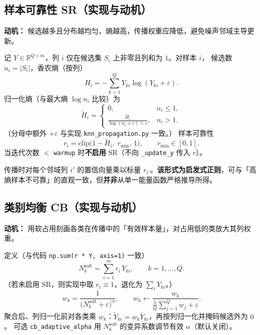 \documentclass[11pt,a4paper]{article}
\begin{document}
\subsection{样本可靠性 SR（实现与动机）}
\textbf{动机：} 候选越多且分布越均匀，熵越高，传播权重应降低，避免噪声邻域主导更新。

记 $Y\in\mathbb{R}^{Q\times m}$，列 $i$ 仅在候选集 $S_i$ 上非零且列和为 $1$。对样本 $i$，
候选数 $n_i=|S_i|$，香农熵（按列）
\begin{equation}
H_i = -\sum_{k=1}^{Q} Y_{ki}\log(Y_{ki}+\varepsilon).
\end{equation}
归一化熵（与最大熵 $\log n_i$ 比较）为
\begin{equation}
\tilde{H}_i =
\begin{cases}
0, & n_i \le 1,\\
\displaystyle\frac{H_i}{\log(n_i+\varepsilon)+\varepsilon}, & n_i>1 .
\end{cases}
\end{equation}
（分母中额外 $+\varepsilon$ 与实现 \texttt{knn\_propagation.py} 一致。）
样本可靠性
\begin{equation}
r_i = \mathrm{clip}\bigl(1-\tilde{H}_i,\; r_{\min},\, 1\bigr),\qquad r_{\min}\in[0,1].
\end{equation}
当迭代次数 $<$ \texttt{warmup} 时\textbf{不启用} SR（不向 \texttt{\_update\_y} 传入 $r$）。

传播时对每个邻域列 $i'$ 的置信向量乘以标量 $r_{i'}$。\textbf{该形式为启发式正则}，可与「高熵样本不可靠」的直观一致，但\textbf{并非}从单一能量函数严格推导所得。

\subsection{类别均衡 CB（实现与动机）}
\textbf{动机：} 用软占用刻画各类在传播中的「有效样本量」，对占用低的类放大其列权重。

定义（与代码 \texttt{np.sum(r * Y, axis=1)} 一致）
\begin{equation}
N_k^{\mathrm{soft}} = \sum_{i=1}^{m} r_i\, Y_{ki},\qquad k=1,\ldots,Q.
\end{equation}
（若未启用 SR，则实现中取 $r_i\equiv 1$，退化为 $\sum_i Y_{ki}$。）
\begin{equation}
w_k = \frac{1}{\bigl(N_k^{\mathrm{soft}}+\varepsilon\bigr)^{\alpha}},\qquad
w_k \leftarrow \frac{w_k}{\frac{1}{Q}\sum_{j=1}^{Q} w_j+\varepsilon}.
\end{equation}
聚合后、列归一化前对各类乘 $w_k$：$\tilde{Y}_{ki}=w_k \bar{Y}_{ki}$，再按列归一化并掩码候选外为 $0$。
可选 \texttt{cb\_adaptive\_alpha} 用 $N_k^{\mathrm{soft}}$ 的变异系数调节有效 $\alpha$（默认关闭）。
\end{document}

